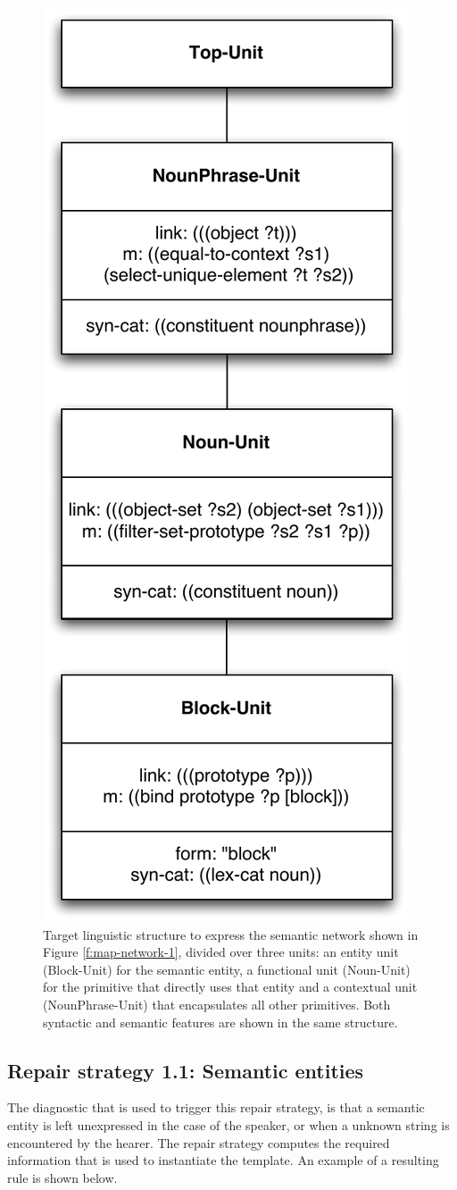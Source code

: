 \begin{figure}[htbp]
  \begin{center}
    \includegraphics[width=.4\textwidth]{./composition/figures/learning-1.pdf}
    \caption[First target linguistic structure to express semantic
    constraint network]{Target linguistic structure to express the semantic
      network shown in Figure \ref{f:map-network-1}, divided over
      three units: an entity unit (Block-Unit) for the semantic
      entity, a functional unit (Noun-Unit) for the primitive that
      directly uses that entity and a contextual unit
      (NounPhrase-Unit) that encapsulates all other primitives. Both
      syntactic and semantic features are shown in the same
      structure.}
    \label{f:map-structure-1}
  \end{center}
\end{figure}

\subsection{Repair strategy 1.1: Semantic entities}

The diagnostic that is used to trigger this repair strategy, is that a
semantic entity is left unexpressed in the case of the speaker, or
when a unknown string is encountered by the hearer. The repair
strategy computes the required information that is used to instantiate
the template. An example of a resulting rule is shown below.

